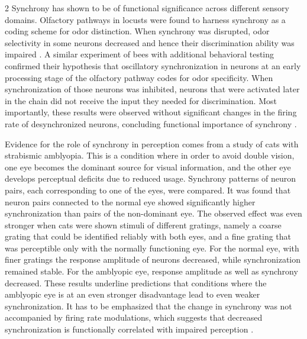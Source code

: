 \documentclass[12pt,a4paper]{article}
\begin{document}
\begin{multicols}{2}
            Synchrony has shown to be of functional significance across different sensory domains. Olfactory pathways in locusts were found to harness synchrony as a coding scheme for odor distinction. When synchrony was disrupted, odor selectivity in some neurons decreased and hence their discrimination ability was impaired \cite{ZL}. A similar experiment of bees with additional behavioral testing confirmed their hypothesis that oscillatory synchronization in neurons at an early processing stage of the olfactory pathway codes for odor specificity. When synchronization of those neurons was inhibited, neurons that were activated later in the chain did not receive the input they needed for discrimination. Most importantly, these results were observed without significant changes in the firing rate of desynchronized neurons, concluding functional importance of synchrony \cite{ZM}.
            
            Evidence for the role of synchrony in perception comes from a study of cats with strabismic amblyopia. This is a condition where in order to avoid double vision, one eye becomes the dominant source for visual information, and the other eye develops perceptual deficits due to reduced usage. Synchrony patterns of neuron pairs, each corresponding to one of the eyes, were compared. It was found that neuron pairs connected to the normal eye showed significantly higher synchronization than pairs of the non-dominant eye. The observed effect was even stronger when cats were shown stimuli of different gratings, namely a coarse grating that could be identified reliably with both eyes, and a fine grating that was perceptible only with the normally functioning eye. For the normal eye, with finer gratings the response amplitude of neurons decreased, while synchronization remained stable. For the amblyopic eye, response amplitude as well as synchrony decreased. These results underline predictions that conditions where the amblyopic eye is at an even stronger disadvantage lead to even weaker synchronization. It has to be emphasized that the change in synchrony was not accompanied by firing rate modulations, which suggests that decreased synchronization is functionally correlated with impaired perception \cite{ZA}.
            

\end{multicols}
\end{document}
